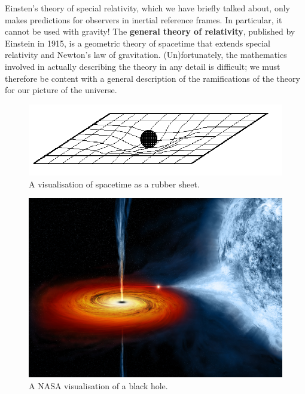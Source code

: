 \documentclass[a4paper]{amsbook}
\theoremstyle{definition}
\numberwithin{exercise}{chapter}
\numberwithin{exercise}{chapter}
\newcommand\capcite[1]{}
\begin{document}
Einsten's theory of special relativity, which we have briefly talked about, only makes predictions for observers in inertial reference frames. In particular,
it cannot be used with gravity! The \textbf{general theory of relativity}, published by Einstein in 1915, is a geometric theory of spacetime that extends
special relativity and Newton's law of gravitation. (Un)fortunately, the mathematics involved in actually describing the theory in any detail is difficult;
we must therefore be content with a general description of the ramifications of the theory for our picture of the universe.

\begin{figure}
  \centering
  \includegraphics[width=\textwidth]{rubbersheet}
  \caption{A visualisation of spacetime as a rubber sheet. \capcite{http://www.oocities.org/tetheory/chapters/images/Image17.gif} \label{fig:rubbersheet}}
\end{figure}
\begin{figure}
  \centering
  \includegraphics[width=\textwidth]{blackhole}
  \caption{A NASA visualisation of a black hole. \capcite{https://www.nasa.gov/sites/default/files/cygx1_ill.jpg} \label{fig:blackhole}}
\end{figure}
\end{document}
